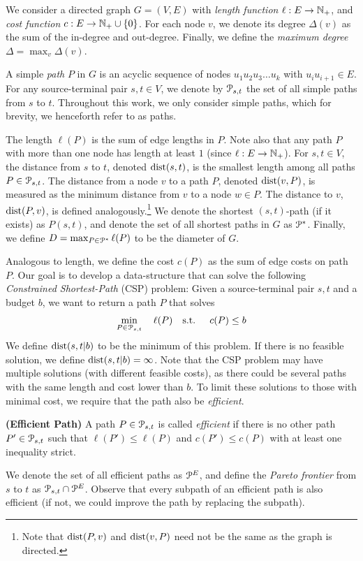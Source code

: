 
We consider a directed graph $G=(V,E)$ with \emph{length function} $\ell:E\to \mathbb{N}_+$, and \emph{cost function} $c:E\to \mathbb{N}_+\cup\{0\}$.
For each node $v$, we denote its degree $\Delta(v)$ as the sum of the in-degree and out-degree.
Finally, we define the \emph{maximum degree} $\Delta = \max_v\Delta(v)$.


A simple \emph{path} $P$ in $G$ is an acyclic sequence of nodes  $u_1u_2u_3\ldots u_k$ with $u_iu_{i+1}\in E$.
For any source-terminal pair $s,t\in V$, we denote by $\mathcal{P}_{s,t}$ the set of all simple paths from $s$ to $t$.
Throughout this work, we only consider simple paths, which for brevity, we henceforth refer to as paths.

The length $\ell(P)$ is the sum of edge lengths in $P$. Note also that any path $P$ with more than one node has length at least $1$ (since $\ell:E\to \mathbb{N}_+$).
For $s,t\in V$, the distance from $s$ to $t$, denoted $\mbox{dist}(s,t)$, is the smallest length among all paths $P\in\mathcal{P}_{s,t}$.
The distance from a node $v$ to a path $P$, denoted $\mbox{dist}(v,P)$, is measured as the minimum distance from $v$ to a node $w\in P$.
The distance to $v$, $\mbox{dist}(P,v)$, is defined analogously.\footnote{Note that  $\mbox{dist}(P,v)$ and  $\mbox{dist}(v,P)$ need not be the same as the graph is directed.}
We denote the shortest $(s,t)$-path (if it exists) as $P(s,t)$, and denote the set of all shortest paths in $G$ as $\mathcal{P}^*$.
Finally, we define $D=\max_{P\in\mathcal{P}^*}\ell(P)$ to be the diameter of $G$.


Analogous to length, we define the cost $c(P)$ as the sum of edge costs on path $P$. 
Our goal is to develop a data-structure that can solve the following \emph{Constrained Shortest-Path} (CSP) problem: Given a source-terminal pair $s,t$ and a budget $b$, we want to return a path $P$ that solves
\begin{align*}
\min_{P \in \mathcal{P}_{s,t}}  \quad \ell(P) \quad
\text{s.t. } \quad  c(P) \leq b 
\end{align*}
We define $\mbox{dist}(s,t|b)$ to be the minimum of this problem.
If there is no feasible solution, we define $\mbox{dist}(s,t|b)=\infty$.
Note that the CSP problem may have multiple solutions (with different feasible costs), as there could be several paths with the same length and cost lower than $b$.
To limit these solutions to those with minimal cost, we require that the path also be \emph{efficient}. 
\begin{definition}
\textbf{(Efficient Path)} A path $P\in \mathcal{P}_{s,t}$ is called \emph{efficient} if there is no other path $P'\in \mathcal{P}_{s,t}$ such that $\ell(P')\leq \ell(P)$ and $c(P')\leq c(P)$ with at least one inequality strict.
\end{definition}
We denote the set of all efficient paths as $\mathcal{P}^E$, and define the \emph{Pareto frontier} from $s$ to $t$ as $\mathcal{P}_{s,t}\cap\mathcal{P}^E$.
Observe that every subpath of an efficient path is also efficient (if not, we could improve the path by replacing the subpath).

